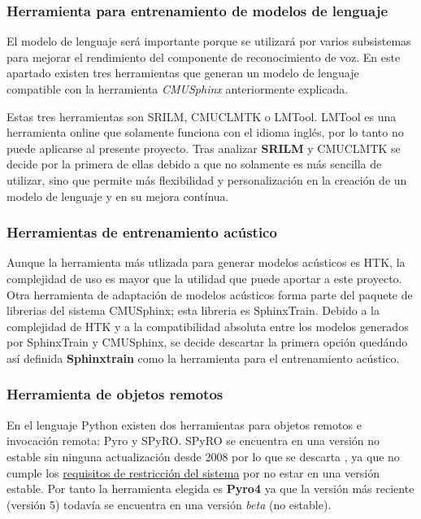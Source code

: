 \documentclass[../main.tex]{subfiles}
\begin{document}
\subsubsection{Herramienta para entrenamiento de modelos de lenguaje}\label{subsub:at-srilm}
El modelo de lenguaje será importante porque se utilizará por varios subsistemas para mejorar el rendimiento del componente de reconocimiento de voz. En este apartado existen tres herramientas que generan un modelo de lenguaje compatible con la herramienta \textit{CMUSphinx} anteriormente explicada.

Estas tres herramientas son SRILM\cite{Stolcke}, CMUCLMTK\cite{Lamere2003a} o LMTool\cite{Rudnicky2010}. LMTool es una herramienta online que solamente funciona con el idioma inglés, por lo tanto no puede aplicarse al presente proyecto. Tras analizar \textbf{SRILM} y CMUCLMTK se decide por la primera de ellas debido a que no solamente es más sencilla de utilizar, sino que permite más flexibilidad y personalización en la creación de un modelo de lenguaje y en su mejora contínua.

\subsubsection{Herramientas de entrenamiento acústico}\label{subsub:at-sphinxbase}
Aunque la herramienta más utlizada para generar modelos acústicos es HTK\cite{Fine1998}, la complejidad de uso es mayor que la utilidad que puede aportar a este proyecto. Otra herramienta de adaptación de modelos acústicos forma parte del paquete de librerias del sistema CMUSphinx; esta libreria es SphinxTrain. Debido a la complejidad de HTK y a la compatibilidad absoluta entre los modelos generados por SphinxTrain y CMUSphinx, se decide descartar la primera opción quedándo así definida \textbf{Sphinxtrain} como la herramienta para el entrenamiento acústico.

\subsubsection{Herramienta de objetos remotos}\label{subsub:at-pyro}
En el lenguaje Python existen dos herramientas para objetos remotos e invocación remota: Pyro\cite{Uber2018} y SPyRO\cite{Tellez2006}. SPyRO se encuentra en una versión no estable sin ninguna actualización desde 2008 por lo que se descarta , ya que no cumple los \hyperref[subsubsec:restricciones]{requisitos de restricción del sistema} por no estar en una versión estable. Por tanto la herramienta elegida es \textbf{Pyro4} ya que la versión más reciente (versión 5) todavía se encuentra en una versión \textit{beta} (no estable).
\end{document}

